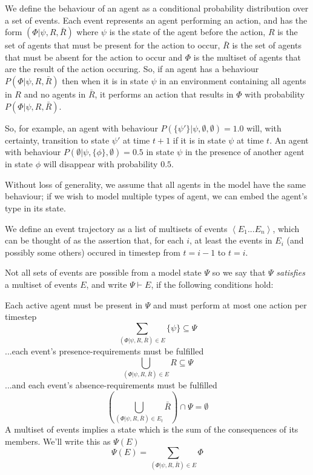 \documentclass{article}
\begin{document}
We define the behaviour of an agent as a conditional probability distribution over a set of events. Each event represents an agent performing an action, and has the form $(\Phi|\psi,R,\bar{R})$ where $\psi$ is the state of the agent before the action, $R$ is the set of agents that must be present for the action to occur, $\bar{R}$ is the set of agents that must be absent for the action to occur and $\Phi$ is the multiset of agents that are the result of the action occuring. So, if an agent has a behaviour $P(\Phi|\psi,R,\bar{R})$ then when it is in state $\psi$ in an environment containing all agents in $R$ and no agents in $\bar{R}$, it performs an action that results in $\Phi$ with probability $P(\Phi|\psi,R,\bar{R})$.

So, for example, an agent with behaviour $P(\{\psi'\}|\psi,\emptyset,\emptyset) = 1.0$ will, with certainty, transition to state $\psi'$ at time $t+1$ if it is in state $\psi$ at time $t$. An agent with behaviour $P(\emptyset|\psi,\{\phi\},\emptyset) = 0.5$ in state $\psi$ in the presence of another agent in state $\phi$ will disappear with probability $0.5$.

Without loss of generality, we assume that all agents in the model have the same behaviour; if we wish to model multiple types of agent, we can embed the agent's type in its state.

We define an event trajectory as a list of multisets of events $\left<E_1...E_n\right>$, which can be thought of as the assertion that, for each $i$, at least the events in $E_i$ (and possibly some others) occured in timestep from $t=i-1$ to $t=i$. 

Not all sets of events are possible from a model state $\Psi$ so we say that $\Psi$ \textit{satisfies} a multiset of events $E$, and write $\Psi\vdash E$, if the following conditions hold:

Each active agent must be present in $\Psi$ and must perform at most one action per timestep
\begin{equation}
\sum_{(\Phi|\psi,R,\bar{R})\in E}\{\psi\} \subseteq \Psi
\label{agency}
\end{equation}
...each event's presence-requirements must be fulfilled
\[
\bigcup_{(\Phi|\psi,R,\bar{R})\in E} R \subseteq \Psi
\]
...and each event's absence-requirements must be fulfilled
\[
\left(\bigcup_{(\Phi|\psi,R,\bar{R})\in E_t} \bar{R}\right) \cap \Psi = \emptyset
\]
A multiset of events implies a state which is the sum of the consequences of its members. We'll write this as $\Psi(E)$
\begin{equation}
\Psi(E) = \sum_{(\Phi|\psi,R,\bar{R})\in E}\Phi
\label{psie}
\end{equation}
\end{document}
